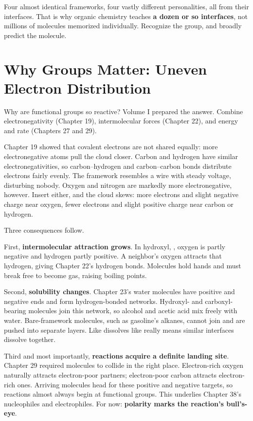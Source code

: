 Four almost identical frameworks, four vastly different personalities, all from their interfaces. That is why organic chemistry teaches \textbf{a dozen or so interfaces}, not millions of molecules memorized individually. Recognize the group, and broadly predict the molecule.

\section{Why Groups Matter: Uneven Electron Distribution}

Why are functional groups so reactive? Volume I prepared the answer. Combine electronegativity (Chapter 19), intermolecular forces (Chapter 22), and energy and rate (Chapters 27 and 29).

Chapter 19 showed that covalent electrons are not shared equally: more electronegative atoms pull the cloud closer. Carbon and hydrogen have similar electronegativities, so carbon--hydrogen and carbon--carbon bonds distribute electrons fairly evenly. The framework resembles a wire with steady voltage, disturbing nobody. Oxygen and nitrogen are markedly more electronegative, however. Insert either, and the cloud skews: more electrons and slight negative charge near oxygen, fewer electrons and slight positive charge near carbon or hydrogen.

Three consequences follow.

First, \textbf{intermolecular attraction grows}. In hydroxyl, , oxygen is partly negative and hydrogen partly positive. A neighbor's oxygen attracts that hydrogen, giving Chapter 22's hydrogen bonds. Molecules hold hands and must break free to become gas, raising boiling points.

Second, \textbf{solubility changes}. Chapter 23's water molecules have positive and negative ends and form hydrogen-bonded networks. Hydroxyl- and carboxyl-bearing molecules join this network, so alcohol and acetic acid mix freely with water. Bare-framework molecules, such as gasoline's alkanes, cannot join and are pushed into separate layers. Like dissolves like really means similar interfaces dissolve together.

Third and most importantly, \textbf{reactions acquire a definite landing site}. Chapter 29 required molecules to collide in the right place. Electron-rich oxygen naturally attracts electron-poor partners; electron-poor carbon attracts electron-rich ones. Arriving molecules head for these positive and negative targets, so reactions almost always begin at functional groups. This underlies Chapter 38's nucleophiles and electrophiles. For now: \textbf{polarity marks the reaction's bull's-eye}.

